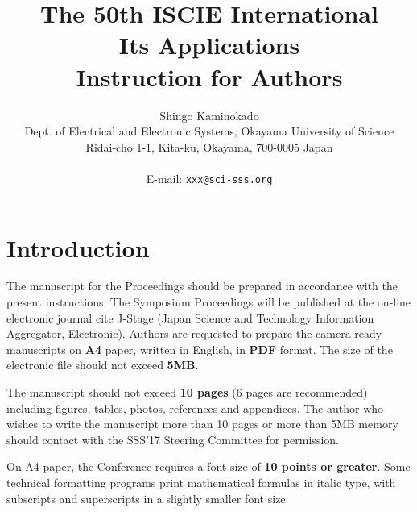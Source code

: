 \documentclass[a4paper]{article}
\begin{document}
\date{}
\title{\LARGE{\bf
The 50th ISCIE International \\
 Its Applications\\
Instruction for Authors}
}
\author{
Shingo Kaminokado \\
Dept. of Electrical and Electronic Systems, Okayama University of Science\\
Ridai-cho 1-1, Kita-ku, Okayama, 700-0005 Japan\\
\\E-mail: \texttt{xxx@sci-sss.org}
}

\maketitle
\thispagestyle{empty}


\section{Introduction}

The manuscript for the Proceedings should be prepared in accordance with the present
instructions.
The Symposium Proceedings will be published at the on-line electronic journal cite 
J-Stage (Japan Science and Technology Information Aggregator, Electronic). 
Authors are requested to prepare the camera-ready manuscripts on {\bf A4} paper,
written in English, in {\bf PDF} format.
The size of the electronic file should not exceed {\bf 5MB}.

The manuscript should not exceed {\bf 10 pages} (6 pages are recommended) including
figures, tables, photos, references and appendices.
The author who wishes to write the manuscript more than 10 pages or more than 5MB
memory should contact with the SSS'17 Steering Committee for permission.
 
On A4 paper, the Conference requires a font size of {\bf 10 points or greater}.
Some technical formatting programs print mathematical formulas in italic type, with
subscripts and superscripts in a slightly smaller font size. 
\end{document}
